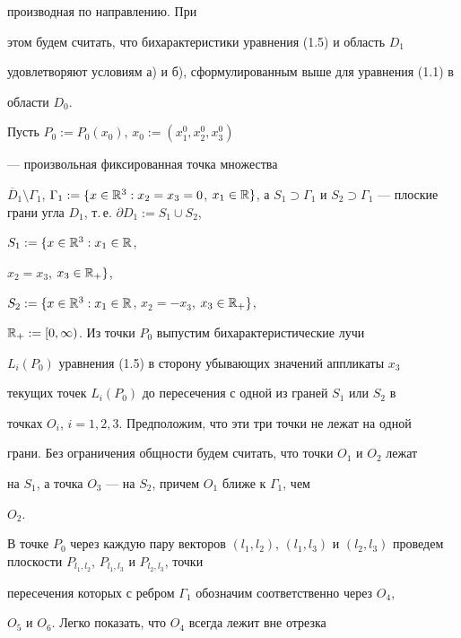 производная по направлению. При


этом будем считать, что бихарактеристики уравнения (1.5) и область $D_1$


удовлетворяют условиям а) и б), сформулированным выше для уравнения (1.1) в


области $D_0$.





Пусть $P_0:=P_0(x_0)$, $x_0:=(x_1^0,x_2^0,x_3^0)$


--- произвольная фиксированная точка множества\linebreak


$\overline D_1\setminus \Gamma_1$, $\Gamma_1:=\{x \in \Bbb{R}^3


:x_2=x_3=0$, $x_1 \in \Bbb{R}\}$, а $S_1 \supset \Gamma_1$ и $S_2 \supset


\Gamma_1$ --- плоские грани угла $D_1$, т.\,е. $\partial D_1:=S_1 \cup S_2$,


$S_1:=\{x \in \Bbb{R}^3:x_1 \in \Bbb{R}$,


$x_2=x_3$, $x_3 \in{\Bbb{R}}_{+}\}$,


$S_2:=\{x\in \Bbb{R}^3:x_1 \in \Bbb{R}$, $x_2=-x_3$, $x_3\in{\Bbb{R}}_{+}\}$,


$\Bbb{R}_{+}:=[0,\infty)$. Из точки $P_0$ выпустим бихарактеристические лучи


$L_i(P_0)$ уравнения (1.5) в сторону убывающих значений аппликаты $x_3$


текущих точек $L_i(P_0)$ до пересечения с одной из граней $S_1$ или $S_2$ в


точках $O_i$, $i=1,2,3$. Предположим, что эти три точки не лежат на одной


грани. Без ограничения общности будем считать, что точки $O_1$ и $O_2$ лежат


на $S_1$, а точка $O_3$ --- на $S_2$, причем $O_1$ ближе к $ \Gamma_1$, чем


$O_2$.





В точке $P_0$ через каждую пару векторов $(l_1,l_2)$, $(l_1,l_3)$ и $(l_2,


l_3)$ проведем плоскости $P_{l_1,l_2}$, $P_{l_1,l_3}$ и $P_{l_2,l_3}$, точки


пересечения которых с ребром $\Gamma_1$ обозначим соответственно через $O_4$,


$O_5$ и $O_6$. Легко показать, что $O_4$ всегда лежит вне отрезка


